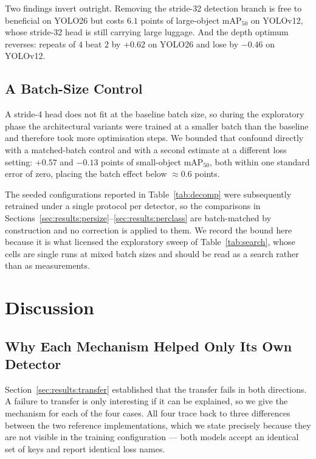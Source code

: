 \documentclass[10pt,twocolumn,a4paper]{article}
\begin{document}
Two findings invert outright. Removing the stride-32 detection branch is free to
beneficial on YOLO26 but costs $6.1$ points of large-object mAP$_{50}$ on
YOLOv12, whose stride-32 head is still carrying large luggage. And the depth
optimum reverses: repeats of $4$ beat $2$ by $+0.62$ on YOLO26 and lose by
$-0.46$ on YOLOv12.

\subsection{A Batch-Size Control}
\label{sec:results:batch}

A stride-4 head does not fit at the baseline batch size, so during the
exploratory phase the architectural variants were trained at a smaller batch
than the baseline and therefore took more optimisation steps. We bounded that
confound directly with a matched-batch control and with a second estimate at a
different loss setting: $+0.57$ and $-0.13$ points of small-object mAP$_{50}$,
both within one standard error of zero, placing the batch effect below
$\approx 0.6$ points.

The seeded configurations reported in Table~\ref{tab:decomp} were subsequently
retrained under a single protocol per detector, so the comparisons in
Sections~\ref{sec:results:persize}--\ref{sec:results:perclass} are
batch-matched by construction and no correction is applied to them. We record
the bound here because it is what licensed the exploratory sweep of
Table~\ref{tab:search}, whose cells are single runs at mixed batch sizes and
should be read as a search rather than as measurements.

\section{Discussion}
\label{sec:discussion}

\subsection{Why Each Mechanism Helped Only Its Own Detector}
\label{sec:disc:why}

Section~\ref{sec:results:transfer} established that the transfer fails in both
directions. A failure to transfer is only interesting if it can be explained, so
we give the mechanism for each of the four cases. All four trace back to three
differences between the two reference implementations, which we state precisely
because they are not visible in the training configuration --- both models accept
an identical set of keys and report identical loss names.
\end{document}

